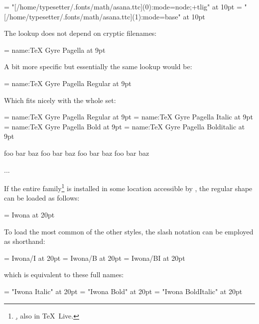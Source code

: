 \beginlisting
  \font \asanamain = "[/home/typesetter/.fonts/math/asana.ttc](0):mode=node;+tlig" at 10pt
  \font \asanamath = "[/home/typesetter/.fonts/math/asana.ttc](1):mode=base" at 10pt
\endlisting

\endsubsubsection


The  lookup does not depend on cryptic filenames:

\beginlisting
  \font \pagellaregular = {name:TeX Gyre Pagella} at 9pt
\endlisting

A bit more specific but essentially the same lookup would be:

\beginlisting
  \font \pagellaregular = {name:TeX Gyre Pagella Regular} at 9pt
\endlisting

\noindent
Which fits nicely with the whole set:

\beginlisting
  \font\pagellaregular    = {name:TeX Gyre Pagella Regular}    at 9pt
  \font\pagellaitalic     = {name:TeX Gyre Pagella Italic}     at 9pt
  \font\pagellabold       = {name:TeX Gyre Pagella Bold}       at 9pt
  \font\pagellabolditalic = {name:TeX Gyre Pagella Bolditalic} at 9pt

  {\pagellaregular     foo bar baz\endgraf}
  {\pagellaitalic      foo bar baz\endgraf}
  {\pagellabold        foo bar baz\endgraf}
  {\pagellabolditalic  foo bar baz\endgraf}

  ...
\endlisting

\endsubsubsection


If the entire  family\footnote{%
  \hyperlink {http://jmn.pl/kurier-i-iwona/},
  also in \TeX\ Live.
}
is installed in some location accessible by ,
the regular shape can be loaded as follows:

\beginlisting
  \font \iwona = Iwona at 20pt
\endlisting

\noindent
To load the most common of the other styles, the slash notation can
be employed as shorthand:

\beginlisting
  \font \iwonaitalic     = Iwona/I    at 20pt
  \font \iwonabold       = Iwona/B    at 20pt
  \font \iwonabolditalic = Iwona/BI   at 20pt
\endlisting

\noindent
which is equivalent to these full names:

\beginlisting
  \font \iwonaitalic     = "Iwona Italic"       at 20pt
  \font \iwonabold       = "Iwona Bold"         at 20pt
  \font \iwonabolditalic = "Iwona BoldItalic"   at 20pt
\endlisting

